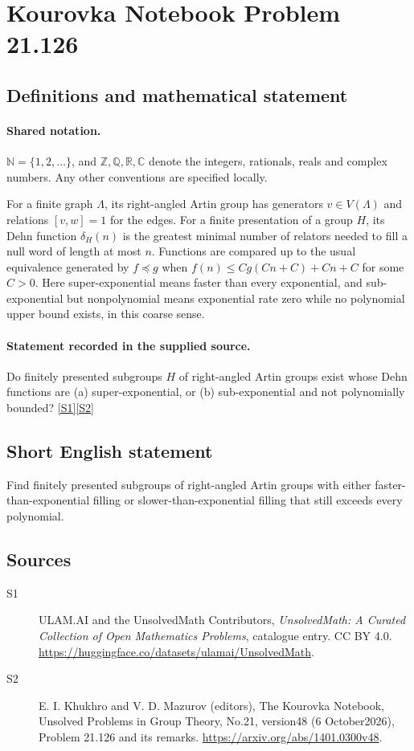 \documentclass[11pt]{article}
\newcommand{\sref}[2]{\hyperlink{source:#1:#2}{[S#2]}}
\begin{document}
\section{Kourovka Notebook Problem 21.126}\label{statement}

\subsection{Definitions and mathematical statement}

\paragraph{Shared notation.}$\mathbb N=\{1,2,\ldots\}$, and $\mathbb Z,\mathbb Q,\mathbb R,\mathbb C$ denote the integers, rationals, reals and complex numbers. Any other conventions are specified locally.


For a finite graph $\Lambda$, its right-angled Artin group has generators $v\in V(\Lambda)$ and relations $[v,w]=1$ for the edges. For a finite presentation of a group $H$, its Dehn function $\delta_H(n)$ is the greatest minimal number of relators needed to fill a null word of length at most $n$. Functions are compared up to the usual equivalence generated by $f\preccurlyeq g$ when $f(n)\leq Cg(Cn+C)+Cn+C$ for some $C>0$. Here super-exponential means faster than every exponential, and sub-exponential but nonpolynomial means exponential rate zero while no polynomial upper bound exists, in this coarse sense.
\paragraph{Statement recorded in the supplied source.}
Do finitely presented subgroups $H$ of right-angled Artin groups exist whose Dehn functions are (a) super-exponential, or (b) sub-exponential and not polynomially bounded? \sref{statement}{1}\sref{statement}{2}
\subsection{Short English statement}
Find finitely presented subgroups of right-angled Artin groups with either faster-than-exponential filling or slower-than-exponential filling that still exceeds every polynomial.
\subsection{Sources}
\begin{description}
\item[\hypertarget{source:statement:1}{S1}] ULAM.AI and the UnsolvedMath Contributors, \emph{UnsolvedMath: A Curated Collection of Open Mathematics Problems}, catalogue entry. CC BY 4.0. \url{https://huggingface.co/datasets/ulamai/UnsolvedMath}.
\item[\hypertarget{source:statement:2}{S2}] E. I. Khukhro and V. D. Mazurov (editors), The Kourovka Notebook, Unsolved Problems in Group Theory, No.21, version48 (6 October2026), Problem 21.126 and its remarks. \url{https://arxiv.org/abs/1401.0300v48}.
\end{description}
\label{end:statement}
\end{document}
